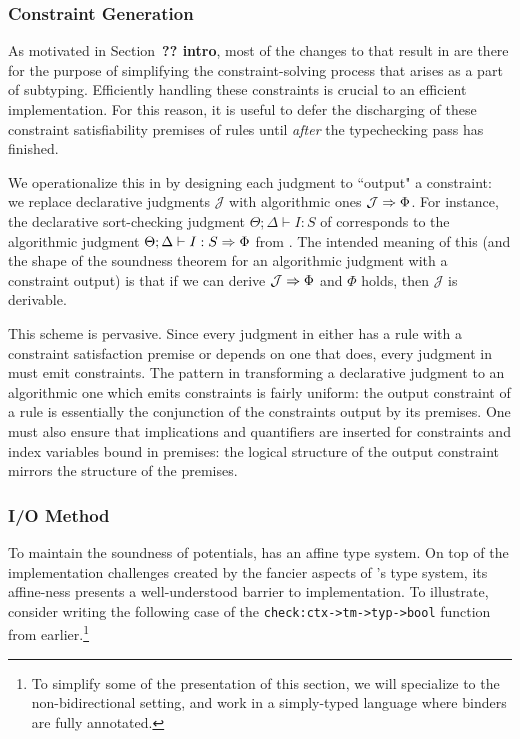 \subsubsection{Constraint Generation}
As motivated in Section~\textbf{?? intro}, most of the changes to \lambdaamorminus that result in \dlambdaamor are there for the purpose of simplifying the constraint-solving process that arises as a part of subtyping. Efficiently handling these constraints is crucial to an efficient implementation. For this reason, it is useful to defer the discharging of these constraint satisfiability premises of rules until \textit{after} the typechecking pass has finished.

We operationalize this in \bilambdaamor by designing each judgment to ``output" a constraint: we replace declarative judgments $\mathcal{J}$ with algorithmic ones $\mathcal{J} \Rightarrow \Phi$. For instance, the declarative sort-checking judgment $\Theta ; \Delta \vdash I : S$ of \dlambdaamor corresponds to the algorithmic judgment $\Theta ; \Delta \vdash I : S \Rightarrow \Phi$ from \bilambdaamor. The intended meaning of this (and the shape of the soundness theorem for an algorithmic judgment with a constraint output) is that if we can derive $\mathcal{J} \Rightarrow \Phi$ and $\Phi$ holds, then $\mathcal{J}$ is derivable.

This scheme is pervasive. Since every judgment in \dlambdaamor either has a rule with a constraint satisfaction premise or depends on one that does, every judgment in \bilambdaamor must emit constraints. The pattern in transforming a declarative judgment to an algorithmic one which emits constraints is fairly uniform: the output constraint of a rule is essentially the conjunction of the constraints output by its premises. One must also ensure that implications and quantifiers are inserted for constraints and index variables bound in premises: the logical structure of the output constraint mirrors the structure of the premises.


\subsubsection{I/O Method}
\label{sec:bilambdaamor-overview-io}
To maintain the soundness of potentials, \dlambdaamor has an affine type system. On top of the implementation challenges created by the fancier aspects of \dlambdaamor's type system, its affine-ness presents a well-understood barrier to implementation. To illustrate, consider writing the following case of the \texttt{check:ctx->tm->typ->bool} function from earlier.\footnote{
To simplify some of the presentation of this section, we will specialize to the non-bidirectional setting, and work in a simply-typed language where binders are fully annotated. 
}

